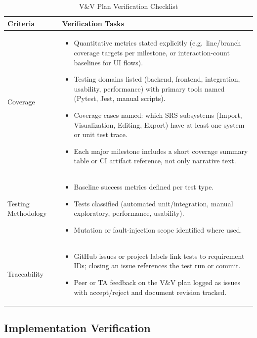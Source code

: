 \documentclass[12pt, titlepage]{article}
\begin{document}
\begin{table}[H]
\centering
\caption{V\&V Plan Verification Checklist}
\label{tab:vnv}
\renewcommand{\arraystretch}{1.3}
\setlength{\tabcolsep}{8pt}
\begin{tabular}{|p{}|p{}|}
\hline
\textbf{Criteria} & \textbf{Verification Tasks} \\ \hline
Coverage &
\begin{itemize}
\item Quantitative metrics stated explicitly (e.g.\ line/branch coverage targets per milestone, or interaction-count baselines for UI flows).
\item Testing domains listed (backend, frontend, integration, usability, performance) with primary tools named (Pytest, Jest, manual scripts).
\item Coverage cases named: which SRS subsystems (Import, Visualization, Editing, Export) have at least one system or unit test trace.
\item Each major milestone includes a short coverage summary table or CI artifact reference, not only narrative text.
\end{itemize} \\ \hline
Testing Methodology &
\begin{itemize}
\item Baseline success metrics defined per test type.
\item Tests classified (automated unit/integration, manual exploratory, performance, usability).
\item Mutation or fault-injection scope identified where used.
\end{itemize} \\ \hline
Traceability &
\begin{itemize}
\item GitHub issues or project labels link tests to requirement IDs; closing an issue references the test run or commit.
\item Peer or TA feedback on the V\&V plan logged as issues with accept/reject and document revision tracked.
\end{itemize} \\ \hline
\end{tabular}
\end{table}


\subsection{Implementation Verification}
\label{sec:impl-verification}
\end{document}
